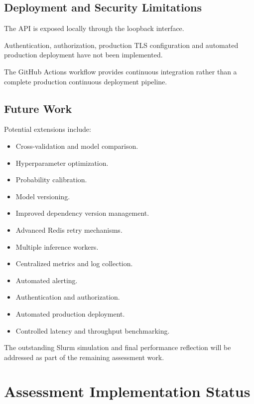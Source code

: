 \documentclass[11pt,a4paper]{article}
\begin{document}
\subsection{Deployment and Security Limitations}

The API is exposed locally through the
loopback interface.

Authentication, authorization, production TLS
configuration and automated production
deployment have not been implemented.

The GitHub Actions workflow provides continuous
integration rather than a complete production
continuous deployment pipeline.

\subsection{Future Work}

Potential extensions include:

\begin{itemize}
    \item Cross-validation and model comparison.
    \item Hyperparameter optimization.
    \item Probability calibration.
    \item Model versioning.
    \item Improved dependency version management.
    \item Advanced Redis retry mechanisms.
    \item Multiple inference workers.
    \item Centralized metrics and log collection.
    \item Automated alerting.
    \item Authentication and authorization.
    \item Automated production deployment.
    \item Controlled latency and throughput benchmarking.
\end{itemize}

The outstanding Slurm simulation and final
performance reflection will be addressed as
part of the remaining assessment work.


\section{Assessment Implementation Status}
\end{document}
